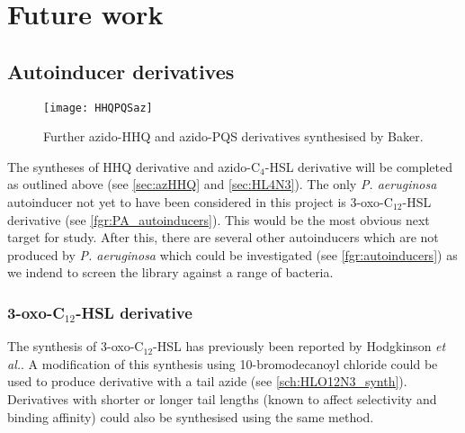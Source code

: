 \section{Future work \label{sec:Fut}}

\subsection{Autoinducer derivatives}

\begin{figure}[H]
	\begin{center}
		\texttt{[image: HHQPQSaz]}
		\caption{Further azido-HHQ  and azido-PQS  derivatives synthesised by Baker.\label{fgr:HHQPQSaz}} 
	\end{center}
\end{figure}

The syntheses of HHQ derivative  and azido-C$_4$-HSL derivative  will be completed as outlined above (see \ref{sec:azHHQ} and \ref{sec:HL4N3}). 
The only \textit{P. aeruginosa} autoinducer not yet to have been considered in this project is 3-oxo-C$_12$-HSL derivative  (see \ref{fgr:PA_autoinducers}). This would be the most obvious next target for study. After this, there are several other autoinducers which are not produced by \textit{P. aeruginosa} which could be investigated (see \ref{fgr:autoinducers}) as we indend to screen the library against a range of bacteria.

\subsubsection{3-oxo-C$_12$-HSL derivative  \label{sec:Fut_HLO12}}

The synthesis of 3-oxo-C$_12$-HSL has previously been reported by Hodgkinson \textit{et al.}\cite{Hodgkinson2011}. A modification of this synthesis using 10-bromodecanoyl chloride could be used to produce derivative  with a tail azide (see \ref{sch:HLO12N3_synth}). Derivatives with shorter or longer tail lengths (known to affect selectivity and binding affinity) could also be synthesised using the same method. 

